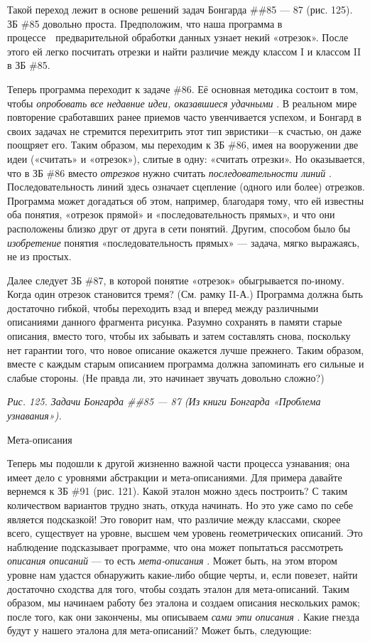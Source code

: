 \documentclass[../main.tex]{subfiles}
\begin{document}
Такой переход лежит в основе решений задач Бонгарда \#\#85 --- 87 (рис. 125). ЗБ \#85 довольно проста. Предположим, что наша программа в процессе~~предварительной обработки данных узнает некий «отрезок». После этого ей легко посчитать отрезки и найти различие между классом I и классом II в ЗБ \#85.

Теперь программа переходит к задаче \#86. Её основная методика состоит в том, чтобы \emph{опробовать все недавние идеи, оказавшиеся удачными} . В реальном мире повторение сработавших ранее приемов часто увенчивается успехом, и Бонгард в своих задачах не стремится перехитрить этот тип эвристики---к счастью, он даже поощряет его. Таким образом, мы переходим к ЗБ \#86, имея на вооружении две идеи («считать» и «отрезок»), слитые в одну: «считать отрезки». Но оказывается, что в ЗБ \#86 вместо \emph{отрезков} нужно считать \emph{последовательности линий} . Последовательность линий здесь означает сцепление (одного или более) отрезков. Программа может догадаться об этом, например, благодаря тому, что ей известны оба понятия, «отрезок прямой» и «последовательность прямых», и что они расположены близко друг от друга в сети понятий. Другим, способом было бы \emph{изобретение} понятия «последовательность прямых» --- задача, мягко выражаясь, не из простых.

Далее следует ЗБ \#87, в которой понятие «отрезок» обыгрывается по-иному. Когда один отрезок становится тремя? (См. рамку II-А.) Программа должна быть достаточно гибкой, чтобы переходить взад и вперед между различными описаниями данного фрагмента рисунка. Разумно сохранять в памяти старые описания, вместо того, чтобы их забывать и затем составлять снова, поскольку нет гарантии того, что новое описание окажется лучше прежнего. Таким образом, вместе с каждым старым описанием программа должна запоминать его сильные и слабые стороны. (Не правда ли, это начинает звучать довольно сложно?)

\emph{Рис. 125. Задачи Бонгарда \#\#85 --- 87 (Из книги Бонгарда «Проблема узнавания»).}

Мета-описания

Теперь мы подошли к другой жизненно важной части процесса узнавания; она имеет дело с уровнями абстракции и мета-описаниями. Для примера давайте вернемся к ЗБ \#91 (рис. 121). Какой эталон можно здесь построить? С таким количеством вариантов трудно знать, откуда начинать. Но это уже само по себе является подсказкой! Это говорит нам, что различие между классами, скорее всего, существует на уровне, высшем чем уровень геометрических описаний. Это наблюдение подсказывает программе, что она может попытаться рассмотреть \emph{описания описаний} --- то есть \emph{мета-описания} . Может быть, на этом втором уровне нам удастся обнаружить какие-либо общие черты, и, если повезет, найти достаточно сходства для того, чтобы создать эталон для мета-описаний. Таким образом, мы начинаем работу без эталона и создаем описания нескольких рамок; после того, как они закончены, мы описываем \emph{сами эти описания} . Какие гнезда будут у нашего эталона для мета-описаний? Может быть, следующие:
\end{document}
